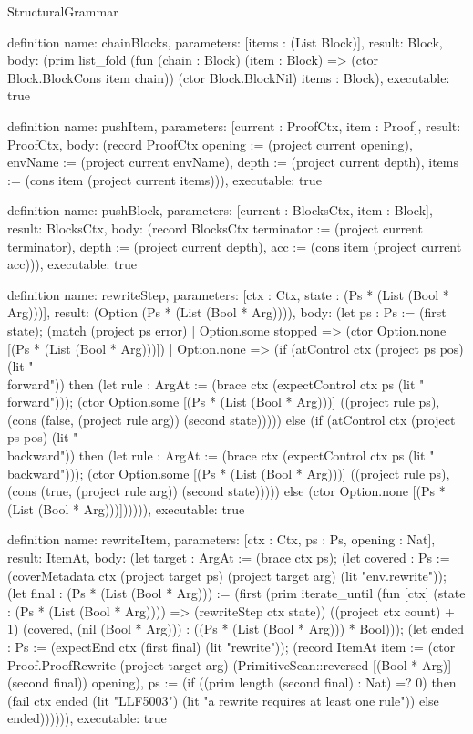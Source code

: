 \begin{lexlean}{StructuralGrammar}
\begin{semanticmodule}
{{definition{
  name: chainBlocks,
  parameters: [items : (List Block)],
  result: Block,
  body: (prim list_fold (fun (chain : Block) (item : Block) => (ctor Block.BlockCons item chain)) (ctor Block.BlockNil) items : Block),
  executable: true
}

definition{
  name: pushItem,
  parameters: [current : ProofCtx, item : Proof],
  result: ProofCtx,
  body: (record ProofCtx {opening := (project current opening), envName := (project current envName), depth := (project current depth), items := (cons item (project current items))}),
  executable: true
}

definition{
  name: pushBlock,
  parameters: [current : BlocksCtx, item : Block],
  result: BlocksCtx,
  body: (record BlocksCtx {terminator := (project current terminator), depth := (project current depth), acc := (cons item (project current acc))}),
  executable: true
}

definition{
  name: rewriteStep,
  parameters: [ctx : Ctx, state : (Ps * (List (Bool * Arg)))],
  result: (Option (Ps * (List (Bool * Arg)))),
  body: (let ps : Ps := (first state); (match (project ps error)
    | Option.some stopped => (ctor Option.none [(Ps * (List (Bool * Arg)))])
    | Option.none => (if (atControl ctx (project ps pos) (lit "\\forward")) then (let rule : ArgAt := (brace ctx (expectControl ctx ps (lit "\\forward"))); (ctor Option.some [(Ps * (List (Bool * Arg)))] ((project rule ps), (cons (false, (project rule arg)) (second state))))) else (if (atControl ctx (project ps pos) (lit "\\backward")) then (let rule : ArgAt := (brace ctx (expectControl ctx ps (lit "\\backward"))); (ctor Option.some [(Ps * (List (Bool * Arg)))] ((project rule ps), (cons (true, (project rule arg)) (second state))))) else (ctor Option.none [(Ps * (List (Bool * Arg)))]))))),
  executable: true
}

definition{
  name: rewriteItem,
  parameters: [ctx : Ctx, ps : Ps, opening : Nat],
  result: ItemAt,
  body: (let target : ArgAt := (brace ctx ps); (let covered : Ps := (coverMetadata ctx (project target ps) (project target arg) (lit "env.rewrite")); (let final : (Ps * (List (Bool * Arg))) := (first (prim iterate_until (fun [ctx] (state : (Ps * (List (Bool * Arg)))) => (rewriteStep ctx state)) ((project ctx count) + 1) (covered, (nil (Bool * Arg))) : ((Ps * (List (Bool * Arg))) * Bool))); (let ended : Ps := (expectEnd ctx (first final) (lit "rewrite")); (record ItemAt {item := (ctor Proof.ProofRewrite (project target arg) (PrimitiveScan::reversed [(Bool * Arg)] (second final)) opening), ps := (if ((prim length (second final) : Nat) =? 0) then (fail ctx ended (lit "LLF5003") (lit "a rewrite requires at least one rule")) else ended)}))))),
  executable: true
}

}}
\end{semanticmodule}
\end{lexlean}
